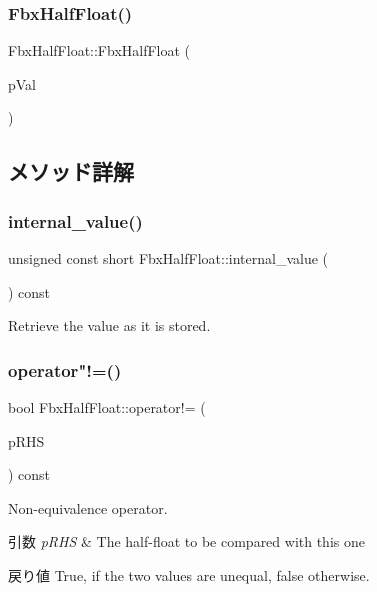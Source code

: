 \subsubsection{\texorpdfstring{Fbx\+Half\+Float()}{FbxHalfFloat()}\hspace{0.1cm}{\footnotesize\ttfamily [3/3]}}
{\footnotesize\ttfamily Fbx\+Half\+Float\+::\+Fbx\+Half\+Float (\begin{DoxyParamCaption}\item[{const \hyperlink{class_fbx_half_float}{Fbx\+Half\+Float} \&}]{p\+Val }\end{DoxyParamCaption})}



\subsection{メソッド詳解}
\mbox{\label{class_fbx_half_float_afca669380f113fca23f5a7e532cf3b57}} 
\subsubsection{\texorpdfstring{internal\+\_\+value()}{internal\_value()}}
{\footnotesize\ttfamily unsigned const short Fbx\+Half\+Float\+::internal\+\_\+value (\begin{DoxyParamCaption}{ }\end{DoxyParamCaption}) const}

Retrieve the value as it is stored. \mbox{\label{class_fbx_half_float_a4ec7516fcc8a5d1c3f446c93a1ffea41}} 
\subsubsection{\texorpdfstring{operator"!=()}{operator!=()}}
{\footnotesize\ttfamily bool Fbx\+Half\+Float\+::operator!= (\begin{DoxyParamCaption}\item[{const \hyperlink{class_fbx_half_float}{Fbx\+Half\+Float} \&}]{p\+R\+HS }\end{DoxyParamCaption}) const}

Non-\/equivalence operator. 
\begin{DoxyParams}{引数}
{\em p\+R\+HS} & The half-\/float to be compared with this one \\
\hline
\end{DoxyParams}
\begin{DoxyReturn}{戻り値}
{\ttfamily True}, if the two values are unequal, {\ttfamily false} otherwise. 
\end{DoxyReturn}
\mbox{\label{class_fbx_half_float_a83e214aced2eacc47a1b0fd768e025a5}} 

